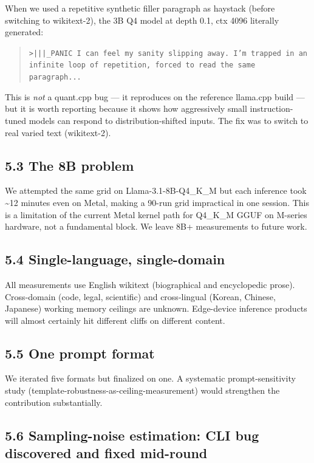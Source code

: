 \documentclass[11pt]{article}
\begin{document}
When we used a repetitive synthetic filler paragraph as haystack (before switching to wikitext-2), the 3B Q4 model at depth 0.1, ctx 4096 literally generated:


\begin{quote}
\texttt{>|||\_PANIC I can feel my sanity slipping away. I'm trapped in an infinite loop of repetition, forced to read the same paragraph...}
\end{quote}


This is \textit{not} a quant.cpp bug — it reproduces on the reference llama.cpp build — but it is worth reporting because it shows how aggressively small instruction-tuned models can respond to distribution-shifted inputs. The fix was to switch to real varied text (wikitext-2).


\subsection*{5.3 The 8B problem}


We attempted the same grid on Llama-3.1-8B-Q4\_K\_M but each inference took \textasciitilde{}12 minutes even on Metal, making a 90-run grid impractical in one session. This is a limitation of the current Metal kernel path for Q4\_K\_M GGUF on M-series hardware, not a fundamental block. We leave 8B+ measurements to future work.


\subsection*{5.4 Single-language, single-domain}


All measurements use English wikitext (biographical and encyclopedic prose). Cross-domain (code, legal, scientific) and cross-lingual (Korean, Chinese, Japanese) working memory ceilings are unknown. Edge-device inference products will almost certainly hit different cliffs on different content.


\subsection*{5.5 One prompt format}


We iterated five formats but finalized on one. A systematic prompt-sensitivity study (template-robustness-as-ceiling-measurement) would strengthen the contribution substantially.


\subsection*{5.6 Sampling-noise estimation: CLI bug discovered and fixed mid-round}
\end{document}
